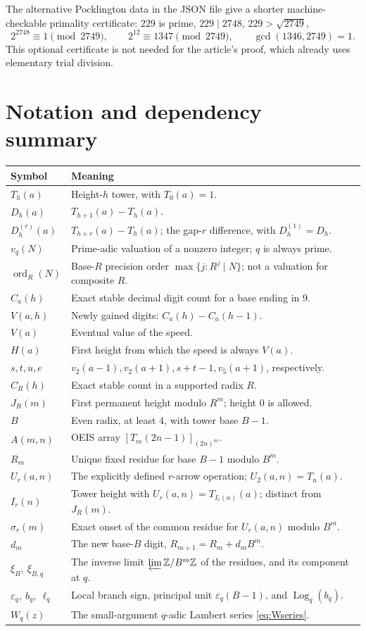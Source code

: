 \documentclass[11pt,letterpaper]{article}
\numberwithin{equation}{section}
\theoremstyle{definition}
\theoremstyle{remark}
\newcommand{\Z}{\mathbb Z}
\newcommand{\eps}{\varepsilon}
\DeclareMathOperator{\ordop}{ord}
\DeclareMathOperator{\Logop}{Log}
\begin{document}
The alternative Pocklington data in the JSON file give a shorter machine-checkable primality certificate: $229$ is prime, $229\mid2748$, $229>\sqrt{2749}$,
\[
 2^{2748}\equiv1\pmod{2749},\qquad
 2^{12}\equiv1347\pmod{2749},\qquad \gcd(1346,2749)=1.
\]
This optional certificate is not needed for the article's proof, which already uses elementary trial division.

\clearpage
\section{Notation and dependency summary}

\begin{longtable}{p{}p{}}
\toprule
Symbol&Meaning\\
\midrule
\endhead
$T_h(a)$&Height-$h$ tower, with $T_0(a)=1$.\\
$D_h(a)$&$T_{h+1}(a)-T_h(a)$.\\
$D_h^{(r)}(a)$&$T_{h+r}(a)-T_h(a)$; the gap-$r$ difference, with $D_h^{(1)}=D_h$.\\
$v_q(N)$&Prime-adic valuation of a nonzero integer; $q$ is always prime.\\
$\ordop_R(N)$&Base-$R$ precision order $\max\{j:R^j\mid N\}$; not a valuation for composite $R$.\\
$C_a(h)$&Exact stable decimal digit count for a base ending in 9.\\
$V(a,h)$&Newly gained digits: $C_a(h)-C_a(h-1)$.\\
$V(a)$&Eventual value of the speed.\\
$H(a)$&First height from which the speed is always $V(a)$.\\
$s,t,u,e$&$v_2(a-1),v_2(a+1),s+t-1,v_5(a+1)$, respectively.\\
$C_R(h)$&Exact stable count in a supported radix $R$.\\
$J_R(m)$&First permanent height modulo $R^m$; height 0 is allowed.\\
$B$&Even radix, at least 4, with tower base $B-1$.\\
$A(m,n)$&OEIS array $[T_m(2n-1)]_{(2n)^m}$.\\
$R_m$&Unique fixed residue for base $B-1$ modulo $B^m$.\\
$U_r(a,n)$&The explicitly defined $r$-arrow operation; $U_2(a,n)=T_n(a)$.\\
$I_r(n)$&Tower height with $U_r(a,n)=T_{I_r(n)}(a)$; distinct from $J_R(m)$.\\
$\sigma_r(m)$&Exact onset of the common residue for $U_r(a,n)$ modulo $B^m$.\\
$d_m$&The new base-$B$ digit, $R_{m+1}=R_m+d_mB^m$.\\
$\xi_B,\ \xi_{B,q}$&The inverse limit $\varprojlim\Z/B^m\Z$ of the residues, and its component at $q$.\\
$\eps_q,\ b_q,\ \ell_q$&Local branch sign, principal unit $\eps_q(B-1)$, and $\Logop_q(b_q)$.\\
$W_q(z)$&The small-argument $q$-adic Lambert series \eqref{eq:Wseries}.\\
\bottomrule
\end{longtable}
\end{document}
